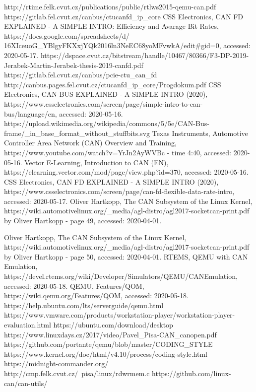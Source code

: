 \documentclass{ctuthesis}
\begin{document}
 
\renewcommand\bibname{References}
\begin{thebibliography}{1}
 http://rtime.felk.cvut.cz/publications/public/rtlws2015-qemu-can.pdf
 https://gitlab.fel.cvut.cz/canbus/ctucanfd\_ip\_core
 CSS Electronics, CAN FD EXPLAINED - A SIMPLE INTRO: Efficiency and Avarage Bit Rates, https://docs.google.com/spreadsheets/d/\\16XIceuoG\_YBlgyFKXxjYQk2016ln3NeEC68yoMFvwkA/edit\#gid=0, accessed: 2020-05-17.
 https://dspace.cvut.cz/bitstream/handle/10467/80366/F3-DP-2019-Jerabek-Martin-Jerabek-thesis-2019-canfd.pdf
 https://gitlab.fel.cvut.cz/canbus/pcie-ctu\_can\_fd
 http://canbus.pages.fel.cvut.cz/ctucanfd\_ip\_core/Progdokum.pdf
 CSS Electronics, CAN BUS EXPLAINED - A SIMPLE INTRO (2020), https://www.csselectronics.com/screen/page/simple-intro-to-can-bus/language/en, accessed: 2020-05-16.
 https://upload.wikimedia.org/wikipedia/commons/5/5e/CAN-Bus-frame/\_in\_base\_format\_without\_stuffbits.svg
 Texas Instruments, Automotive Controller Area Network (CAN) Overview and Training, https://www.youtube.com/watch?v=YrJn2AyWVBc - time 4:40, accessed: 2020-05-16.
 Vector E-Learning, Introduction to CAN (EN), https://elearning.vector.com/mod/page/view.php?id=370, accessed: 2020-05-16.
 CSS Electronics, CAN FD EXPLAINED - A SIMPLE INTRO (2020), https://www.csselectronics.com/screen/page/can-fd-flexible-data-rate-intro, accessed: 2020-05-17.
 Oliver Hartkopp, The CAN Subsystem of the Linux Kernel, https://wiki.automotivelinux.org/\_media/agl-distro/agl2017-socketcan-print.pdf by Oliver Hartkopp - page 49, accessed: 2020-04-01.

 Oliver Hartkopp, The CAN Subsystem of the Linux Kernel, https://wiki.automotivelinux.org/\_media/agl-distro/agl2017-socketcan-print.pdf by Oliver Hartkopp - page 50, accessed: 2020-04-01.
 RTEMS, QEMU with CAN Emulation, https://devel.rtems.org/wiki/Developer/Simulators/QEMU/CANEmulation, accessed: 2020-05-18.
 QEMU, Features/QOM, https://wiki.qemu.org/Features/QOM, accessed: 2020-05-18.
 https://help.ubuntu.com/lts/serverguide/qemu.html
 https://www.vmware.com/products/workstation-player/workstation-player-evaluation.html
 https://ubuntu.com/download/desktop
 https://www.linuxdays.cz/2017/video/Pavel\_Pisa-CAN\_canopen.pdf
 https://github.com/portante/qemu/blob/master/CODING\_STYLE
 https://www.kernel.org/doc/html/v4.10/process/coding-style.html
 https://midnight-commander.org/
 http://cmp.felk.cvut.cz/~pisa/linux/rdwrmem.c
 https://github.com/linux-can/can-utils/
\end{thebibliography}
\end{document}
